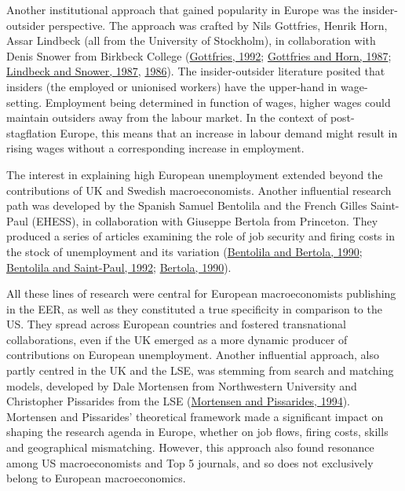 \documentclass[
  12pt,
  onecolumn]{article}
\begin{document}
Another institutional approach that gained popularity in Europe was the insider-outsider perspective. The approach was crafted by Nils Gottfries, Henrik Horn, Assar Lindbeck (all from the University of Stockholm), in collaboration with Denis Snower from Birkbeck College (\protect\hyperlink{ref-gottfries1992}{Gottfries, 1992}; \protect\hyperlink{ref-gottfries1987}{Gottfries and Horn, 1987}; \protect\hyperlink{ref-lindbeck1987a}{Lindbeck and Snower, 1987}, \protect\hyperlink{ref-lindbeck1986}{1986}). The insider-outsider literature posited that insiders (the employed or unionised workers) have the upper-hand in wage-setting. Employment being determined in function of wages, higher wages could maintain outsiders away from the labour market. In the context of post-stagflation Europe, this means that an increase in labour demand might result in rising wages without a corresponding increase in employment.

The interest in explaining high European unemployment extended beyond the contributions of UK and Swedish macroeconomists. Another influential research path was developed by the Spanish Samuel Bentolila and the French Gilles Saint-Paul (EHESS), in collaboration with Giuseppe Bertola from Princeton. They produced a series of articles examining the role of job security and firing costs in the stock of unemployment and its variation (\protect\hyperlink{ref-bentolila1990}{Bentolila and Bertola, 1990}; \protect\hyperlink{ref-bentolila1992a}{Bentolila and Saint-Paul, 1992}; \protect\hyperlink{ref-bertola1990a}{Bertola, 1990}).

All these lines of research were central for European macroeconomists publishing in the EER, as well as they constituted a true specificity in comparison to the US. They spread across European countries and fostered transnational collaborations, even if the UK emerged as a more dynamic producer of contributions on European unemployment. Another influential approach, also partly centred in the UK and the LSE, was stemming from search and matching models, developed by Dale Mortensen from Northwestern University and Christopher Pissarides from the LSE (\protect\hyperlink{ref-mortensen1994}{Mortensen and Pissarides, 1994}). Mortensen and Pissarides' theoretical framework made a significant impact on shaping the research agenda in Europe, whether on job flows, firing costs, skills and geographical mismatching. However, this approach also found resonance among US macroeconomists and Top 5 journals, and so does not exclusively belong to European macroeconomics.
\end{document}
